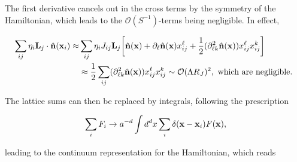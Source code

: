 The first derivative cancels out in the cross terms by the symmetry of the Hamiltonian, which leads to the $\mathcal{O}(S^{-1})$-terms being negligible. In effect,

\begin{equation}
    \begin{split}
        \sum_{ij} \eta_i {\bf L}_j \cdot\hat{{\bf n}}({\bf x}_i) \approx& \sum_{ij} \eta_i J_{ij} {\bf L}_j \bigg[ \hat{{\bf n}}({\bf x}) +  \partial_{\ell} \hat{{\bf n}}({\bf x}) x_{ij}^{\ell} + \frac{1}{2} (\partial_{\ell k}^2 \hat{{\bf n}}({\bf x})) x_{ij}^{\ell} x_{ij}^{k} \bigg] \\
        &\approx \frac{1}{2} \sum_{ij} (\partial_{\ell k}^2 \hat{{\bf n}}({\bf x})) x_{ij}^{\ell} x_{ij}^{k} \sim \mathcal{O}(\Lambda R_J)^2, \textnormal{ which are negligible. }
    \end{split}
\end{equation}

The lattice sums can then be replaced by integrals, following the prescription

\begin{equation}
    \sum_{i} F_i \rightarrow a^{-d} \int d^d x \sum_{i} \delta({\bf x} - {\bf x}_i) F({\bf x}),
\end{equation}

leading to the continuum representation for the Hamiltonian, which reads

